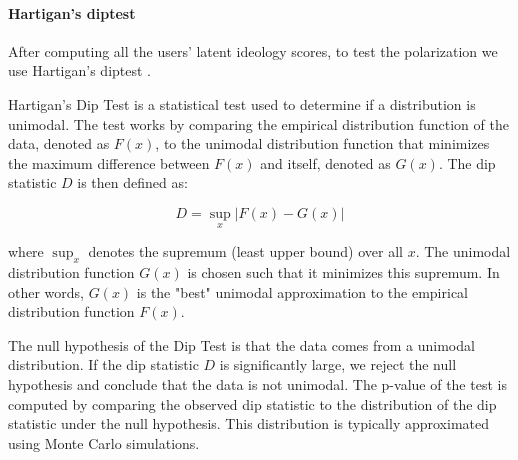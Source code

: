\paragraph{Hartigan's diptest}

After computing all the users' latent ideology scores, to test the polarization we use Hartigan's diptest \cite{hartigan_dip_1985}.

Hartigan's Dip Test is a statistical test used to determine if a distribution is unimodal. The test works by comparing the empirical distribution function of the data, denoted as $F(x)$, to the unimodal distribution function that minimizes the maximum difference between $F(x)$ and itself, denoted as $G(x)$. The dip statistic $D$ is then defined as:

\begin{equation}
D = \sup_x |F(x) - G(x)|
\end{equation}

where $\sup_x$ denotes the supremum (least upper bound) over all $x$. The unimodal distribution function $G(x)$ is chosen such that it minimizes this supremum. In other words, $G(x)$ is the "best" unimodal approximation to the empirical distribution function $F(x)$.

The null hypothesis of the Dip Test is that the data comes from a unimodal distribution. If the dip statistic $D$ is significantly large, we reject the null hypothesis and conclude that the data is not unimodal. The p-value of the test is computed by comparing the observed dip statistic to the distribution of the dip statistic under the null hypothesis. This distribution is typically approximated using Monte Carlo simulations.
